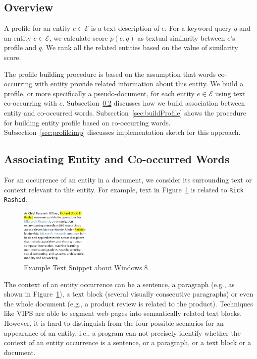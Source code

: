 \documentclass{sig-alternate}
\theoremstyle{definition}
\begin{document}
\subsection{Overview}
A profile for an entity $e \in \mathcal{E}$ is a text description of $e$. For a keyword query $q$ and an entity $e \in \mathcal{E}$, we calculate score $p(e, q)$ as textual similarity between $e$'s profile and $q$. We rank all the related entities based on the value of similarity score.

The profile building procedure is based on the assumption that words co-occurring with entity provide related information about this entity. We build a profile, or more specifically a pseudo-document, for each entity $e \in \mathcal{E}$ using text co-occurring with $e$. Subsection~\ref{sec:association} discusses how we build association between entity and co-occurred words. Subsection~\ref{sec:buildProfile} shows the procedure for building entity profile based on co-occurring words. Subsection~\ref{sec:profileimp} discusses implementation sketch for this approach.

\subsection{Associating Entity and Co-occurred Words}\label{sec:association}
For an occurrence of an entity in a document, we consider its surrounding text or context relevant to this entity. For example, text in Figure~\ref{fig:textwindow8} is related to {\tt Rick Rashid}.
\begin{figure}[htbp]
\center
\includegraphics[width=0.3\textwidth]{img/text.jpg}
\caption{Example Text Snippet about Windows 8\label{fig:textwindow8}}
\end{figure}
The context of an entity occurrence can be a sentence, a paragraph (e.g., as shown in Figure~\ref{fig:textwindow8}), a text block (several visually consecutive paragraphs) or even the whole document (e.g., a product review is related to the product). Techniques like VIPS\cite{cai2003vips} are able to segment web pages into semantically related text blocks. However, it is hard to distinguish from the four possible scenarios for an appearance of an entity, i.e., a program can not precisely identify whether the context of an entity occurrence is a sentence, or a paragraph, or a text block or a document.
\end{document}
